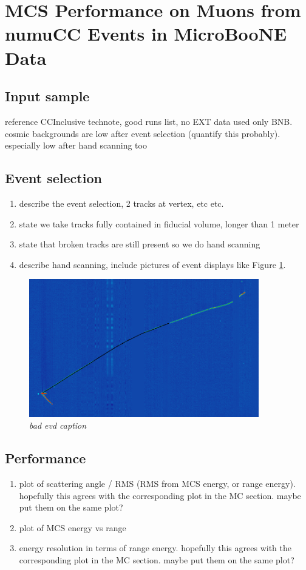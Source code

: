 \section{MCS Performance on Muons from numuCC Events in MicroBooNE Data}\label{data_performance_section}

\subsection{Input sample}
reference CCInclusive technote, good runs list, no EXT data used only BNB. cosmic backgrounds are low after event selection (quantify this probably). especially low after hand scanning too

\subsection{Event selection}
\begin{enumerate}
\item describe the event selection, 2 tracks at vertex, etc etc.
\item state we take tracks fully contained in fiducial volume, longer than 1 meter
\item state that broken tracks are still present so we do hand scanning
\item describe hand scanning, include pictures of event displays like Figure \ref{bad_evd_fig_1}.
\end{enumerate}

\begin{figure}[h!]
\begin{center}
\includegraphics[width=100mm]{Figures/bad_evd_1.png}
\end{center}
\caption{\textit{bad evd caption}}
\label{bad_evd_fig_1}
\end{figure}

\subsection{Performance}
\begin{enumerate}
\item plot of scattering angle / RMS (RMS from MCS energy, or range energy). hopefully this agrees with the corresponding plot in the MC section. maybe put them on the same plot?
\item plot of MCS energy vs range
\item energy resolution in terms of range energy. hopefully this agrees with the corresponding plot in the MC section. maybe put them on the same plot?
\end{enumerate}